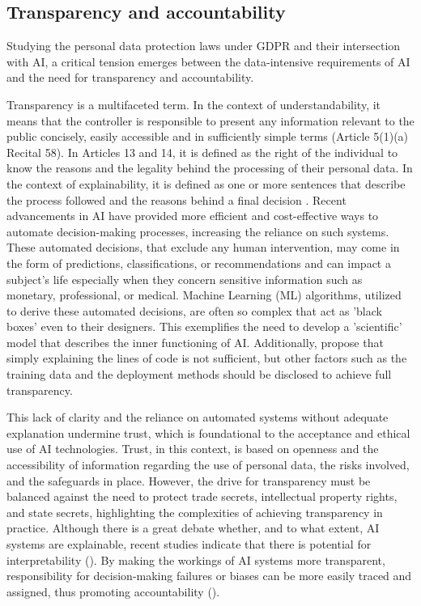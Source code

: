 \documentclass{article}
\begin{document}
\subsection{Transparency and accountability}
\label{ssec:transparency}

Studying the personal data protection laws under GDPR and their intersection with AI, a critical tension emerges between the data-intensive requirements of AI and the need for transparency and accountability. 

Transparency is a multifaceted term. In the context of understandability, it means that the controller is responsible to present any information relevant to the public concisely, easily accessible and in sufficiently simple terms (Article 5(1)(a) Recital 58). In Articles 13 and 14, it is defined as the right of the individual to know the reasons and the legality behind the processing of their personal data. In the context of explainability, it is defined as one or more sentences that describe the process followed and the reasons behind a final decision \cite{ExplainabilityWhy}. Recent advancements in AI have provided more efficient and cost-effective ways to automate decision-making processes, increasing the reliance on such systems. These automated decisions, that exclude any human intervention, may come in the form of predictions, classifications, or recommendations and can impact a subject's life especially when they concern sensitive information such as monetary, professional, or medical. Machine Learning (ML) algorithms, utilized to derive these automated decisions, are often so complex that act as 'black boxes' even to their designers. This exemplifies the need to develop a 'scientific' model that describes the inner functioning of AI. Additionally, \cite{TSAKALAKIS2021105527} propose that simply explaining the lines of code is not sufficient, but other factors such as the training data and the deployment methods should be disclosed to achieve full transparency.

This lack of clarity and the reliance on automated systems without adequate explanation undermine trust, which is foundational to the acceptance and ethical use of AI technologies. Trust, in this context, is based on openness and the accessibility of information regarding the use of personal data, the risks involved, and the safeguards in place. However, the drive for transparency must be balanced against the need to protect trade secrets, intellectual property rights, and state secrets, highlighting the complexities of achieving transparency in practice. Although there is a great debate whether, and to what extent, AI systems are explainable, recent studies indicate that there is potential for interpretability (\cite{främling2020explainable,TSAKALAKIS2021105527}). By making the workings of AI systems more transparent, responsibility for decision-making failures or biases can be more easily traced and assigned, thus promoting accountability (\cite{HouseOfCommons2016RoboticsAI}).
\end{document}
